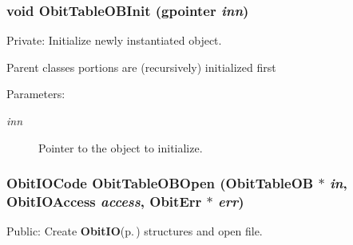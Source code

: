 \subsubsection{\setlength{\rightskip}{0pt plus 5cm}void Obit\-Table\-OBInit (gpointer {\em inn})}\label{ObitTableOB_8c_a8}


Private: Initialize newly instantiated object. 

Parent classes portions are (recursively) initialized first \begin{Desc}
\item[Parameters:]
\begin{description}
\item[{\em inn}]Pointer to the object to initialize. \end{description}
\end{Desc}
\subsubsection{\setlength{\rightskip}{0pt plus 5cm}Obit\-IOCode Obit\-Table\-OBOpen ({\bf Obit\-Table\-OB} $\ast$ {\em in}, Obit\-IOAccess {\em access}, {\bf Obit\-Err} $\ast$ {\em err})}\label{ObitTableOB_8c_a21}


Public: Create {\bf Obit\-IO}{\rm (p.\,\pageref{structObitIO})} structures and open file. 

